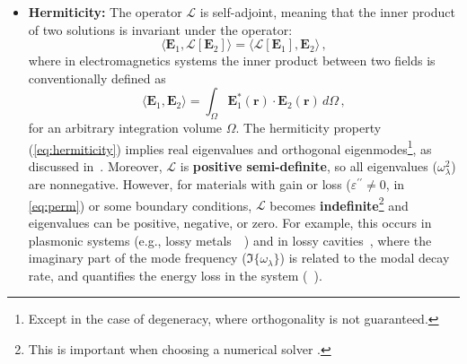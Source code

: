 \begin{itemize}
        \item \textbf{Hermiticity:} The operator $\mathcal{L}$ is self-adjoint,
              meaning that the inner product of two solutions is invariant under the
              operator:
              \begin{equation}\label{eq:hermiticity}
                \langle \mathbf{E}_1, \mathcal{L}[\mathbf{E}_2] \rangle = \langle \mathcal{L}[\mathbf{E}_1], \mathbf{E}_2 \rangle\,,
            \end{equation}
            where in electromagnetics systems the inner product between two fields is conventionally defined as
            \begin{equation}
                \langle \mathbf{E}_1, \mathbf{E}_2 \rangle = \int_\Omega \mathbf{E}_1^*(\mathbf{r}) \cdot \mathbf{E}_2(\mathbf{r}) \, d\Omega\,,
            \end{equation}
            for an arbitrary integration volume $\Omega$.
              The hermiticity property (\eqref{eq:hermiticity}) implies real eigenvalues and orthogonal eigenmodes\footnote{Except in
                  the case of degeneracy, where orthogonality is not guaranteed.}, as discussed
              in~\cite{phot_crys}.
              Moreover, $\mathcal{L}$ is \textbf{positive semi-definite}, so all
              eigenvalues ($\omega_\lambda^2$) are nonnegative. However, for materials with
              gain or loss
              ($\varepsilon^{\prime\prime} \neq 0$, in \eqref{eq:perm}) or some boundary conditions, $\mathcal{L}$
              becomes \textbf{indefinite}\footnote{This is important when choosing a numerical solver .} and eigenvalues can be positive, negative, or zero. For example, this occurs in plasmonic
              systems
              (e.g., lossy metals~~\cite{ownpub0}) and in lossy cavities~\cite{ownpub4},
              where the imaginary part of the mode frequency ($\Im\{\omega_\lambda\}$) is
              related to the modal decay rate, and quantifies the energy loss in the system (~\cite{ownpub0}).


\end{itemize}
